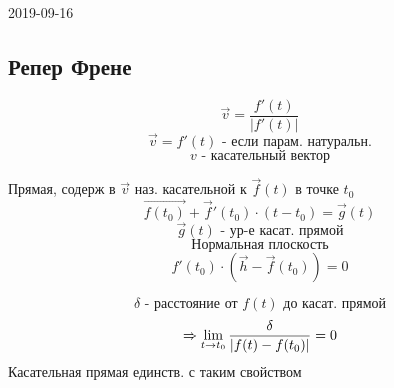 \documentclass[main, 12pt, fleqn]{subfiles}
\begin{document}
\begin{lect} {2019-09-16}
\subsection{Репер Френе}
	\begin{Definition}
		\[\vec{v} = \frac{f'(t)}{|f'(t)|}\]
		\[\vec{v} = f'(t) \text{ - если парам. натуральн.}\]
		\[v \text{ - касательный вектор}\]
	\end{Definition}

	\begin{Definition}
		Прямая, содерж в $\vec{v}$ наз. касательной к $\vec{f}(t)$ в точке $t_0$
		\[\vec{f(t_0)} + \vec{f}'(t_0) \cdot (t - t_0) = \vec{g}(t)\]
		\[\vec{g}(t) \text{ - ур-е касат. прямой}\]
		\[\text{Нормальная плоскость}\]
		\[f'(t_0) \cdot (\vec{h} - \vec{f}(t_0)) = 0\]
	\end{Definition}

	\begin{Theorem}
		\[\delta \text{ - расстояние от }f(t) \text{ до касат. прямой}\]
		\[\Rightarrow \lim_{t \to t_0} \frac{\delta}{|f(t) - f(t_0)|} = 0 \]
		Касательная прямая единств. с таким свойством
	\end{Theorem}


\end{lect}
\end{document}
